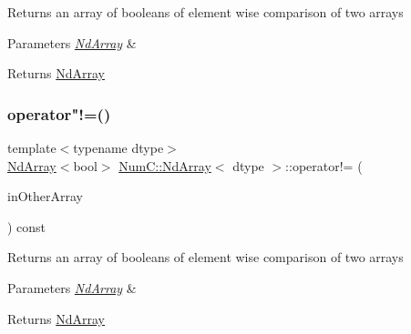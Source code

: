 Returns an array of booleans of element wise comparison of two arrays


\begin{DoxyParams}{Parameters}
{\em \mbox{\hyperlink{class_num_c_1_1_nd_array}{Nd\+Array}}} & \\
\hline
\end{DoxyParams}
\begin{DoxyReturn}{Returns}
\mbox{\hyperlink{class_num_c_1_1_nd_array}{Nd\+Array}} 
\end{DoxyReturn}
\mbox{\label{class_num_c_1_1_nd_array_a190298f1e71725ffb270d28eb08cacbf}} 
\subsubsection{\texorpdfstring{operator"!=()}{operator!=()}\hspace{0.1cm}{\footnotesize\ttfamily [2/2]}}
{\footnotesize\ttfamily template$<$typename dtype$>$ \\
\mbox{\hyperlink{class_num_c_1_1_nd_array}{Nd\+Array}}$<$bool$>$ \mbox{\hyperlink{class_num_c_1_1_nd_array}{Num\+C\+::\+Nd\+Array}}$<$ dtype $>$\+::operator!= (\begin{DoxyParamCaption}\item[{const \mbox{\hyperlink{class_num_c_1_1_nd_array}{Nd\+Array}}$<$ dtype $>$ \&}]{in\+Other\+Array }\end{DoxyParamCaption}) const\hspace{0.3cm}{\ttfamily [inline]}}

Returns an array of booleans of element wise comparison of two arrays


\begin{DoxyParams}{Parameters}
{\em \mbox{\hyperlink{class_num_c_1_1_nd_array}{Nd\+Array}}} & \\
\hline
\end{DoxyParams}
\begin{DoxyReturn}{Returns}
\mbox{\hyperlink{class_num_c_1_1_nd_array}{Nd\+Array}} 
\end{DoxyReturn}
\mbox{\label{class_num_c_1_1_nd_array_a61f33df532c6205509d462a60e0d292b}} 
